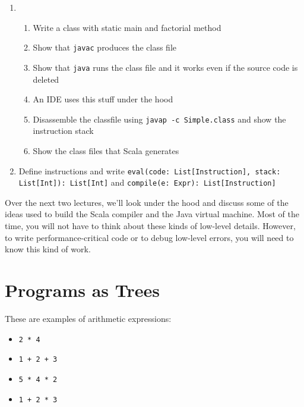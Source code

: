 \begin{instructor}
\begin{enumerate}
  \item 

  \begin{enumerate}

    \item Write a class with static main  and factorial method

    \item Show that \texttt{javac} produces the class file

    \item Show that \texttt{java} runs the class file and it works even if the source code is deleted

    \item An IDE uses this stuff under the hood

    \item Disassemble the classfile using \texttt{javap -c Simple.class} and show the instruction stack

    \item Show the class files that Scala generates

  \end{enumerate}

  \item Define instructions and write
  \lstinline|eval(code: List[Instruction], stack: List[Int]): List[Int]|
  and \lstinline|compile(e: Expr): List[Instruction]|
  


\end{enumerate}

\end{instructor}

Over the next two lectures, we'll look under the hood and
discuss some of the ideas used to build the Scala compiler and the Java virtual machine.
Most of the time, you will not have to think about these kinds of low-level details.
However, to write performance-critical code or to debug low-level
errors, you will need to know this kind of work.


\section{Programs as Trees}

These are examples of arithmetic expressions:

\begin{itemize}

\item \verb|2 * 4|

\item \verb|1 + 2 + 3|

\item \verb|5 * 4 * 2|

\item \verb|1 + 2 * 3|

\end{itemize}
%

